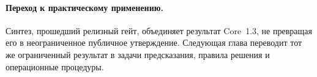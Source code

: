 \begingroup
\small

\endgroup

\paragraph{Переход к практическому применению.}
Синтез, прошедший релизный гейт, объединяет результат Core~1.3, не
превращая его в неограниченное публичное утверждение. Следующая глава
переводит тот же ограниченный результат в задачи предсказания, правила
решения и операционные процедуры.
